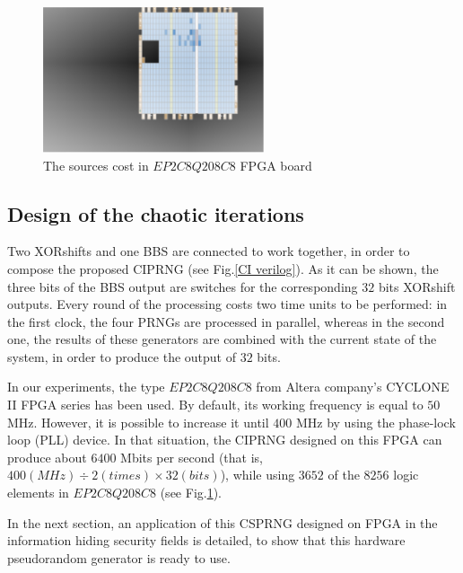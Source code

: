 \begin{figure}
\begin{center}
  \includegraphics[width=6.5cm]{print.eps}
\end{center}
\caption{The sources cost in $EP2C8Q208C8$ FPGA board}
 \label{logic elements}
\end{figure}

\subsection{Design of the chaotic iterations}
Two XORshifts and one BBS are connected to work together, in order to compose the
proposed CIPRNG (see Fig.\ref{CI verilog}). 
As it can be shown, the three bits of the BBS output are switches for the corresponding $32$ bits XORshift outputs. Every round of the 
 processing costs two time units
 to be performed: in the first clock, 
the four PRNGs are processed in parallel,
whereas in the second one, the results of these generators are combined with 
the current state of the system, in order to produce the output of $32$ bits. 

In our experiments, the type $EP2C8Q208C8$ from Altera 
company's CYCLONE II FPGA series 
has been used. By default, its working
frequency is equal to $50$ MHz.
However, it is possible to increase it until
$400$ MHz by using the phase-lock loop (PLL) device.
In that situation, the CIPRNG designed on this
FPGA can produce about $6400$ Mbits per second
(that is, $400 (MHz) \div 2 (times) \times 32 (bits)$),
while using $3652$ of the $8256$ logic 
elements in $EP2C8Q208C8$ (see
Fig.\ref{logic elements}). 

In the next section, an application of this 
CSPRNG designed on FPGA in the information 
hiding security fields is detailed, to show
that this hardware pseudorandom generator 
is ready to use.
